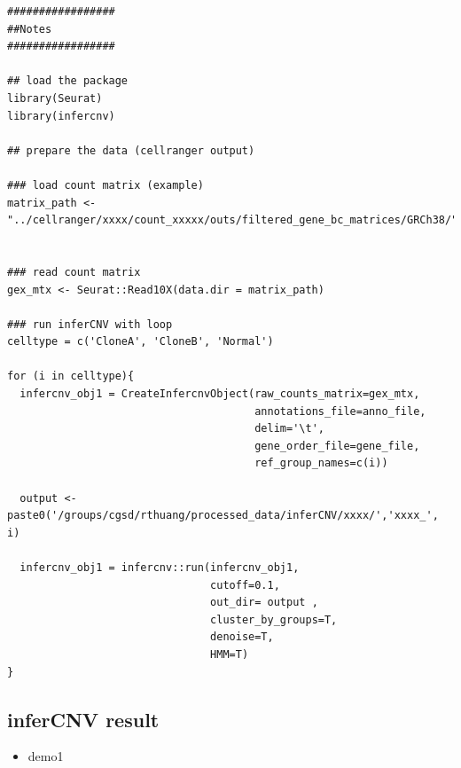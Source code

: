 \documentclass[
]{book}
\providecommand{\tightlist}{%
  \setlength{\itemsep}{0pt}\setlength{\parskip}{0pt}}
\begin{document}
\begin{verbatim}
#################
##Notes
#################

## load the package
library(Seurat)
library(infercnv)

## prepare the data (cellranger output)

### load count matrix (example)
matrix_path <- "../cellranger/xxxx/count_xxxxx/outs/filtered_gene_bc_matrices/GRCh38/"


### read count matrix
gex_mtx <- Seurat::Read10X(data.dir = matrix_path)

### run inferCNV with loop
celltype = c('CloneA', 'CloneB', 'Normal')

for (i in celltype){
  infercnv_obj1 = CreateInfercnvObject(raw_counts_matrix=gex_mtx,
                                       annotations_file=anno_file,
                                       delim='\t',
                                       gene_order_file=gene_file,
                                       ref_group_names=c(i))
  
  output <- paste0('/groups/cgsd/rthuang/processed_data/inferCNV/xxxx/','xxxx_', i)
  
  infercnv_obj1 = infercnv::run(infercnv_obj1,
                                cutoff=0.1,  
                                out_dir= output , 
                                cluster_by_groups=T,   
                                denoise=T,
                                HMM=T)
}
\end{verbatim}

\hypertarget{infercnv-result}{%
\subsection{inferCNV result}\label{infercnv-result}}

\begin{itemize}
\tightlist
\item
  demo1
\end{itemize}
\end{document}

